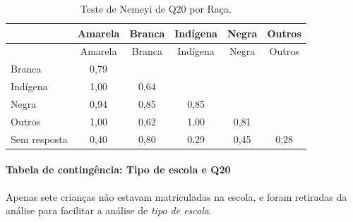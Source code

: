 \documentclass[]{article}
\let\oldparagraph\paragraph
\renewcommand{\paragraph}[1]{\oldparagraph{#1}\mbox{}}
\begin{document}
\begin{longtable}[]{@{}lccccc@{}}
\caption{\label{tab:unnamed-chunk-315}Teste de Nemeyi de Q20 por Raça.}\tabularnewline
\toprule
& Amarela & Branca & Indígena & Negra & Outros\tabularnewline
\midrule
\endfirsthead
\toprule
& Amarela & Branca & Indígena & Negra & Outros\tabularnewline
\midrule
\endhead
Branca & 0,79 & & & &\tabularnewline
Indígena & 1,00 & 0,64 & & &\tabularnewline
Negra & 0,94 & 0,85 & 0,85 & &\tabularnewline
Outros & 1,00 & 0,62 & 1,00 & 0,81 &\tabularnewline
Sem resposta & 0,40 & 0,80 & 0,29 & 0,45 & 0,28\tabularnewline
\bottomrule
\end{longtable}

\cleardoublepage

\hypertarget{tabela-de-continguxeancia-tipo-de-escola-e-q20}{%
\paragraph{Tabela de contingência: Tipo de escola e Q20}\label{tabela-de-continguxeancia-tipo-de-escola-e-q20}}

Apenas sete crianças não estavam matriculadas na escola, e foram retiradas da análise para facilitar a análise de \emph{tipo de escola}.
\end{document}
